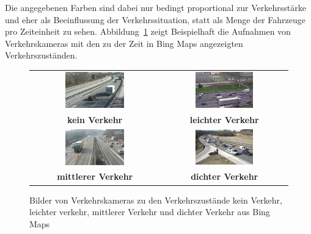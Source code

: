 Die angegebenen Farben sind dabei nur bedingt proportional zur Verkehrsstärke und eher als Beeinflussung der Verkehrssituation, statt als Menge der Fahrzeuge pro Zeiteinheit zu sehen. Abbildung~\ref{fig:uebersicht_verkehrszustaende} zeigt Beispielhaft die Aufnahmen von Verkehrskameras mit den zu der Zeit in Bing Maps angezeigten Verkehrszuständen.\\  
\begin{figure}
\begin{tabular}{@{}cc@{}}
\includegraphics[width = 0.48\textwidth]{images/no_traffic.png} &
\includegraphics[width = 0.48\textwidth]{images/low_traffic.png} \\ 
\textbf{kein Verkehr}  & \textbf{leichter Verkehr}   \\
\includegraphics[width = 0.48\textwidth]{images/medium_traffic.png} & 
\includegraphics[width = 0.48\textwidth]{images/heavy_traffic.png} \\
\textbf{mittlerer Verkehr} & \textbf{dichter Verkehr}\\
\end{tabular}
\caption{Bilder von Verkehrskameras zu den Verkehrszustände kein Verkehr, leichter verkehr, mittlerer Verkehr und dichter Verkehr aus Bing Maps}
\label{fig:uebersicht_verkehrszustaende}
\end{figure}

